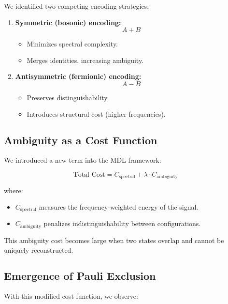 \documentclass[11pt]{article}
\begin{document}
We identified two competing encoding strategies:

\begin{enumerate}
    \item \textbf{Symmetric (bosonic) encoding:}
    \[
        A + B
    \]
    \begin{itemize}
        \item Minimizes spectral complexity.
        \item Merges identities, increasing ambiguity.
    \end{itemize}

    \item \textbf{Antisymmetric (fermionic) encoding:}
    \[
        A - B
    \]
    \begin{itemize}
        \item Preserves distinguishability.
        \item Introduces structural cost (higher frequencies).
    \end{itemize}
\end{enumerate}

\subsection{Ambiguity as a Cost Function}

We introduced a new term into the MDL framework:

\[
\text{Total Cost} = C_{\text{spectral}} + \lambda \cdot C_{\text{ambiguity}}
\]

where:
\begin{itemize}
    \item $C_{\text{spectral}}$ measures the frequency-weighted energy of the signal.
    \item $C_{\text{ambiguity}}$ penalizes indistinguishability between configurations.
\end{itemize}

This ambiguity cost becomes large when two states overlap and cannot be uniquely reconstructed.

\subsection{Emergence of Pauli Exclusion}

With this modified cost function, we observe:
\end{document}
